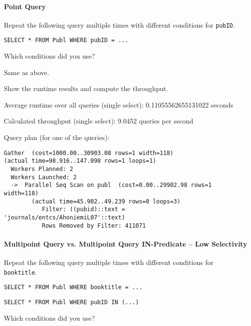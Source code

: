 \documentclass[11pt]{scrartcl}
\begin{document}
\paragraph{Point Query}

Repeat the following query multiple times with different conditions for \texttt{pubID}.

\begin{lstlisting}[style=dbtsql]
SELECT * FROM Publ WHERE pubID = ...
\end{lstlisting}


Which conditions did you use?

Same as above.

Show the runtime results and compute the throughput.

Average runtime over all queries (single select): 0.11055562655131022 seconds



Calculated throughput (single select): 9.0452 queries per second



Query plan (for one of the queries):

{\small
\parskip0pt\begin{verbatim}
Gather  (cost=1000.00..30903.08 rows=1 width=118) 
(actual time=98.916..147.098 rows=1 loops=1)
  Workers Planned: 2
  Workers Launched: 2
  ->  Parallel Seq Scan on publ  (cost=0.00..29902.98 rows=1 width=118) 
        (actual time=45.902..49.239 rows=0 loops=3)
           Filter: ((pubid)::text = 'journals/entcs/AhoniemiL07'::text)
           Rows Removed by Filter: 411071
\end{verbatim}}

\paragraph{Multipoint Query vs. Multipoint Query IN-Predicate -- Low Selectivity}

Repeat the following query multiple times with different conditions for \texttt{booktitle}.

\begin{lstlisting}[style=dbtsql]
SELECT * FROM Publ WHERE booktitle = ...
\end{lstlisting}

\begin{lstlisting}[style=dbtsql]
SELECT * FROM Publ WHERE pubID IN (...)
\end{lstlisting}

Which conditions did you use?
\end{document}
